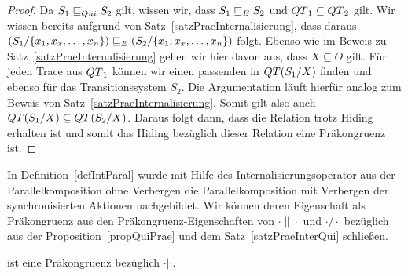 \begin{proof}
  Da $S_1\sqsubseteq _{Qui} S_2$ gilt, wissen wir, dass $S_1\sqsubseteq _E S_2$ und $QT{}_1\subseteq
  QT{}_2$ gilt. Wir wissen bereits aufgrund von
  Satz~\ref{satzPraeInternalisierung}, dass daraus $(S_1/\{x_1,x_x,\dots
  ,x_n\})\sqsubseteq _E (S_2/\{x_1,x_x,\dots ,x_n\})$ folgt. Ebenso wie im Beweis zu
  Satz~\ref{satzPraeInternalisierung} gehen wir hier davon aus, dass
  $X\subseteq O$ gilt. Für jeden Trace aus $QT{}_1$ können wir einen passenden in
  $QT{}(S_1/X)$ finden und ebenso für das Transitionssystem $S_2$. Die
  Argumentation läuft hierfür analog zum Beweis von
  Satz~\ref{satzPraeInternalisierung}. Somit gilt
  also auch $QT{}(S_1/X)\subseteq QT{}(S_2/X)$. Daraus folgt dann, dass die
  Relation \QRel{} trotz Hiding erhalten ist und somit das Hiding bezüglich
  dieser Relation eine Präkongruenz ist.
\end{proof}

In Definition~\ref{defIntParal} wurde mit Hilfe des Internalisierungsoperator
aus der Parallelkomposition ohne Verbergen die Parallelkomposition mit
Verbergen der synchronisierten Aktionen nachgebildet. Wir können deren
Eigenschaft als Präkongruenz aus den Präkongruenz-Eigenschaften von
$\cdot\|\cdot$ und $\cdot /\cdot$ bezüglich \QRel{} aus der
Proposition~\ref{propQuiPrae} und dem Satz~\ref{satzPraeInterQui} schließen.

\begin{kor}
  \QRel{} ist eine Präkongruenz bezüglich $\cdot |\cdot$.
\end{kor}
